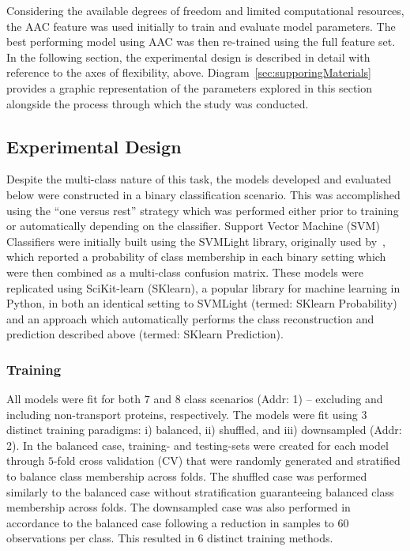Considering the available degrees of freedom and limited computational resources, the AAC feature was used initially
to train and evaluate model parameters. The best performing model using AAC was then re-trained using the full feature
set. In the following section, the experimental design is described in detail with reference to the axes of flexibility,
above. Diagram~\ref{sec:supporingMaterials} provides a graphic representation of the parameters explored in this
section alongside the process through which the study was conducted.

\subsection{Experimental Design}
\label{sec:experimentaldesign}
Despite the multi-class nature of this task, the models developed and evaluated below were constructed in a binary
classification scenario. This was accomplished using the ``one versus rest'' strategy which was performed either prior
to training or automatically depending on the classifier. Support Vector Machine (SVM) Classifiers were initially built
using the SVMLight library, originally used by~\cite{mishra2014prediction}, which reported a probability of class
membership in each binary setting which were then combined as a multi-class confusion matrix. These models were
replicated using SciKit-learn (SKlearn), a popular library for machine learning in Python, in both an identical setting
to SVMLight (termed: SKlearn Probability) and an approach which automatically performs the class reconstruction and
prediction described above (termed: SKlearn Prediction). 

\subsubsection{Training}
All models were fit for both $7$ and $8$ class scenarios (Addr: 1) -- excluding and including non-transport proteins,
respectively. The models were fit using $3$ distinct training paradigms: i) balanced, ii) shuffled, and iii)
downsampled (Addr: 2). In the balanced case, training- and testing-sets were created for each model through $5$-fold
cross validation (CV) that were randomly generated and stratified to balance class membership across folds. The
shuffled case was performed similarly to the balanced case without stratification guaranteeing balanced class membership
across folds. The downsampled case was also performed in accordance to the balanced case following a reduction in
samples to $60$ observations per class. This resulted in $6$ distinct training methods.

